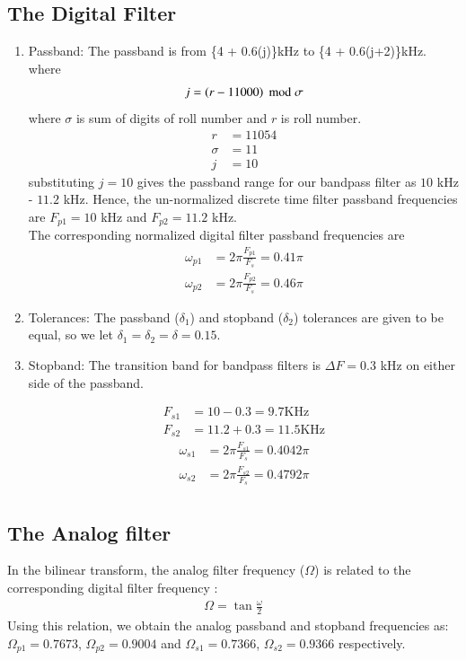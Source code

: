 \documentclass{article}
\begin{document}
\subsection{The Digital Filter}
\begin{enumerate}
\item {Passband:}
The passband is from \{4 + 0.6(j)\}kHz to \{4 + 0.6(j+2)\}kHz. \\
where 
\begin{align}
    j=\left(r-11000\right) \;  \text{mod} \; \sigma
\end{align}
where $\sigma$ is sum of digits of roll number and $r$ is roll number.\\
\begin{align}
    r&=11054\\
    \sigma  &= 11\\
    j&=10
\end{align}
 substituting $j =10$ gives the passband
range for our bandpass filter as $10$ kHz - $11.2$ kHz.  Hence, the un-normalized discrete time filter
passband frequencies are $F_{p1} = 10$ kHz
and $F_{p2} = 11.2$ kHz. \\
The corresponding normalized digital filter passband frequencies are
\begin{align}
    \omega_{p1} &= 2\pi\frac{F_{p1}}{F_s} = 0.41 \pi\\
    \omega_{p2} &= 2\pi\frac{F_{p2}}{F_s}  = 0.46\pi
\end{align}

\item {Tolerances:}  The passband ($\delta_1$) and stopband ($\delta_2$) tolerances are given to
be equal, so we let $\delta_1 = \delta_2 = \delta = 0.15$.

\item { Stopband:}  The {transition band} for bandpass filters is $\Delta F = 0.3$ kHz on either side of the passband.

\begin{align}
    F_{s1} &= 10-0.3 = 9.7 \text{KHz}\\
    F	_{s2} &= 11.2+0.3 = 11.5 \text{KHz}
\end{align}
\begin{align}
    \omega_{s1} &= 2\pi\frac{F_{s1}}{F_s} = 0.4042 \pi\\
     \omega_{s2} &= 2\pi\frac{F_{s2}}{F_s} = 0.4792 \pi\\
\end{align}
\end{enumerate}
\subsection{The Analog filter}
In the bilinear transform, the analog filter frequency ($\Omega$) is related to the corresponding digital filter frequency\brak{\omega} :
\begin{align}
  \Omega = \tan \frac{\omega}{2}  
\end{align}
Using this relation, we obtain the analog passband and stopband frequencies as:
$\Omega_{p1} = 0.7673$, $\Omega_{p2} = 0.9004$ and $\Omega_{s1} = 0.7366$, $\Omega_{s2} = 0.9366$
respectively.
\end{document}
